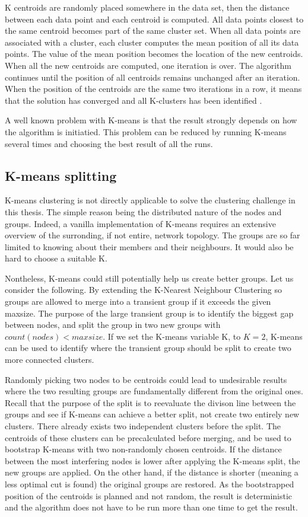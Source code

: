 K centroids are randomly placed somewhere in the data set, then the distance between each data point and each centroid is computed. All data points
closest to the same centroid becomes part of the same cluster set. When all data points are associated with a cluster, each cluster computes the mean position of all its data points.
The value of the mean position becomes the location of the new centroids. When all the new centroids are computed, one iteration is over. The algorithm continues until the position 
of all centroids remains unchanged after an iteration. When the position of the centroids are the same two iterations in a row, it means that the solution has converged and all K-clusters has been identified \cite{mackaymeans}.

A well known problem with K-means is that the result strongly depends on how the algorithm is initiatied. This problem can be reduced by running K-means several times
and choosing the best result of all the runs. 

\subsection{K-means splitting}
K-means clustering is not directly applicable to solve the clustering challenge in this thesis. The simple reason being the distributed nature of
the nodes and groups. Indeed, a vanilla implementation of K-means requires an extensive overview of the surronding, if not entire, network topology.
The groups are so far limited to knowing about their members and their neighbours. It would also be hard to choose a suitable K. 

Nontheless, K-means could still potentially help us create better groups. Let us consider the following.
By extending the K-Nearest Neighbour Clustering so groups are allowed to merge into a transient group if it exceeds the given maxsize.
The purpose of the large transient group is to identify the biggest gap between nodes, and split the group in two new groups with
$count(nodes) < maxsize$. If we set the K-means variable K, to $K=2$, K-means can be used to identify where the transient group should be split to create two more connected clusters. 

Randomly picking two nodes to be centroids could lead to undesirable results where the two resulting groups are fundamentally different from the original ones.
Recall that the purpose of the split is to reevaluate the divison line between the groups and see if K-means can achieve a better split, not create two entirely new clusters.
There already exists two independent clusters before the split. The centroids of these clusters can be precalculated before merging, and be used to bootstrap K-means with two non-randomly chosen
centroids.
If the distance between the most interfering nodes is lower after applying the K-means split, the new groups are applied. On the other hand, if the distance is shorter
(meaning a less optimal cut is found) the original groups are restored. As the bootstrapped position of the centroids is planned and not random,
the result is deterministic and the algorithm does not have to be run more than one time to get the result. 


